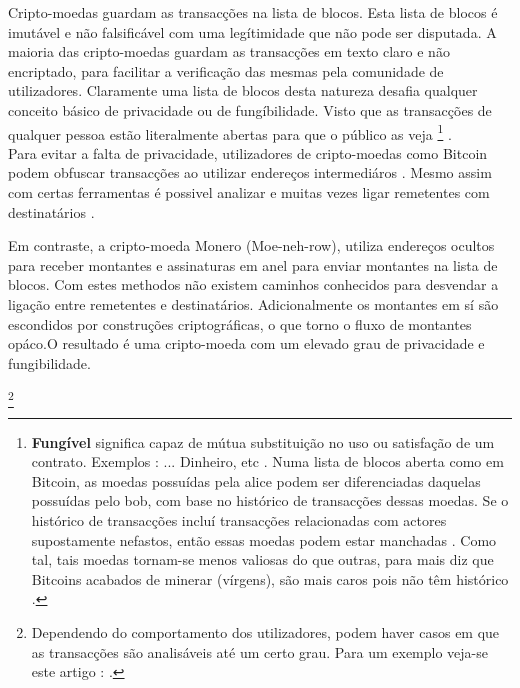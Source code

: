 Cripto-moedas guardam as transacções na lista de blocos. Esta lista de blocos é imutável e não falsificável com uma legítimidade que não pode ser disputada. A maioria das cripto-moedas guardam as transacções em texto claro e não encriptado, para facilitar a verificação das mesmas pela comunidade de utilizadores. Claramente uma lista de blocos desta natureza desafia qualquer conceito básico de privacidade ou de fungíbilidade. Visto que as transacções de qualquer pessoa estão literalmente abertas para que o público as veja \footnote{ \textbf{Fungível} significa capaz de mútua substituição no uso ou satisfação de um contrato. Exemplos : ... Dinheiro, etc \cite{mises-org-fungible}. Numa lista de blocos aberta como em Bitcoin, as moedas possuídas pela alice podem ser diferenciadas daquelas possuídas pelo bob, com base no histórico de transacções dessas moedas. Se o histórico de transacções incluí transacções relacionadas com actores supostamente nefastos, então essas moedas podem estar manchadas \cite{bitcoin-big-bang-taint}. Como tal, tais moedas tornam-se menos valiosas do que outras, para mais diz que Bitcoins acabados de minerar (vírgens), são mais caros pois não têm histórico \cite{new-bitcoin-premium}.} .
\\
Para evitar a falta de privacidade, utilizadores de cripto-moedas como Bitcoin podem obfuscar transacções ao utilizar endereços intermediáros \cite{DBLP:journals/corr/NarayananM17}. Mesmo assim com certas ferramentas é possivel analizar e muitas vezes ligar remetentes com destinatários \cite{DBLP:journals/corr/ShenTuY15b, DK-police-tracing-btc, Andrew-Cox-Sandia, chainalysis-2020-report}.

Em contraste, a cripto-moeda Monero (Moe-neh-row), utiliza endereços ocultos para receber montantes e assinaturas em anel para enviar montantes na lista de blocos.  
Com estes methodos não existem caminhos conhecidos para desvendar a ligação entre remetentes e destinatários. Adicionalmente os montantes em sí são escondidos por construções criptográficas, o que torno o fluxo de montantes opáco.\newline O resultado é uma cripto-moeda com um elevado grau de privacidade e fungibilidade.

\footnote{Dependendo do comportamento dos utilizadores, podem haver casos em que as transacções são analisáveis até um certo grau. Para um exemplo veja-se este artigo : \cite{monero-ring-heuristics-ryo}.}

